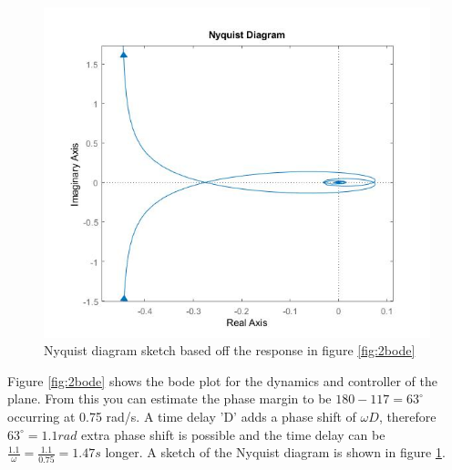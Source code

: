 \documentclass[twoside,twocolumn]{article}
\begin{document}
\begin{figure}[h]
  \centering
    \includegraphics[width=\linewidth]{2_nyquist}
  \caption{Nyquist diagram sketch based off the response in figure \ref{fig:2bode} }
  \label{fig:2nyquist}
\end{figure}

Figure \ref{fig:2bode} shows the bode plot for the dynamics and controller of the plane. From this you can estimate the phase margin to be $180-117=63^{\circ}$ occurring at 0.75 rad/s. A time delay 'D' adds a phase shift of $\omega D$, therefore $63^{\circ}=1.1rad$ extra phase shift is possible and the time delay can be $\frac{1.1}{\omega}=\frac{1.1}{0.75}=1.47s$ longer. 
A sketch of the Nyquist diagram is shown in figure \ref{fig:2nyquist}.
\end{document}
